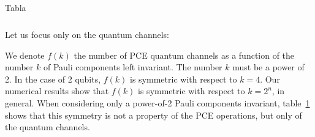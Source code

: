 \documentclass[11pt,dvipsnames]{article} %
\newcommand{\tref}[1]{table~\ref{#1}}
\newcommand{\1}{\mathds{1}}
\begin{document}
\begin{itemize}
\begin{table}[H]
{\begin{tabular}{l|cccccccccccccccc}
\end{tabular}%
}
\caption{Tabla}
\label{tab:qtm_channels}
\end{table}
Let us focus only on the quantum channels:
\begin{table}[H]
\centering
{}
\end{table}
We denote $f(k)$ the number of PCE quantum channels as a function
of the number $k$ of Pauli components left invariant. The number $k$
must be a power of 2.
In the case of 2 qubits, $f(k)$ is symmetric with respect to $k=4$. 
Our numerical results show that $f(k)$ is symmetric with respect
to $k=2^n$, in general. When 
considering only a power-of-2 Pauli components invariant,  
\tref{tab:qtm_channels} shows that this symmetry 
is not a property of the PCE operations, but only of the quantum channels.


\end{itemize}
\end{document}
